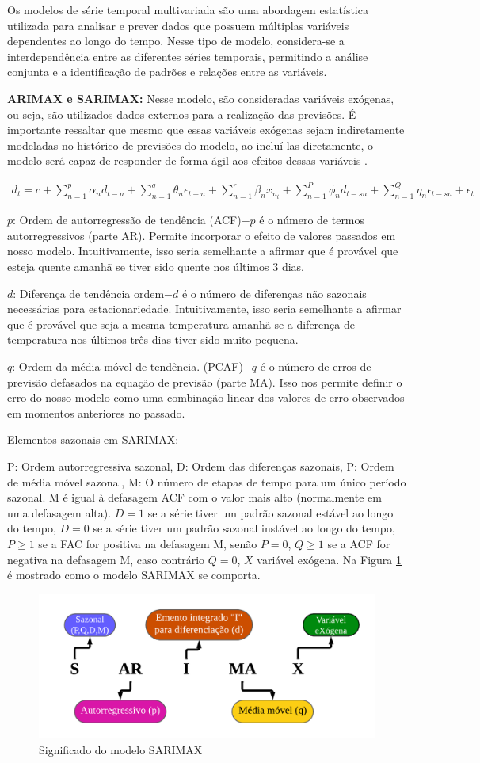Os modelos de série temporal multivariada são uma abordagem estatística utilizada para analisar e prever dados que possuem múltiplas variáveis dependentes ao longo do tempo. Nesse tipo de modelo, considera-se a interdependência entre as diferentes séries temporais, permitindo a análise conjunta e a identificação de padrões e relações entre as variáveis. 

\textbf{ARIMAX e SARIMAX:}
Nesse modelo, são consideradas variáveis exógenas, ou seja, são utilizados dados externos para a realização das previsões. É importante ressaltar que mesmo que essas variáveis exógenas sejam indiretamente modeladas no histórico de previsões do modelo, ao incluí-las diretamente, o modelo será capaz de responder de forma ágil aos efeitos dessas variáveis  \cite{sarima}.

\begin{eqnarray}
	d_t=c+\sum_{n=1}^p \alpha_n d_{t-n}+\sum_{n=1}^q \theta_n \epsilon_{t-n}+\sum_{n=1}^r \beta_n x_{n_t}+\sum_{n=1}^P \phi_n d_{t-s n}+\sum_{n=1}^Q \eta_n \epsilon_{t-s n}+\epsilon_t \label{eq:sarmax}
\end{eqnarray}

$p$: Ordem de autorregressão de tendência (ACF)$-p$ é o número de termos autorregressivos (parte AR). Permite incorporar o efeito de valores passados em nosso modelo. Intuitivamente, isso seria semelhante a afirmar que é provável que esteja quente amanhã se tiver sido quente nos últimos 3 dias.

$d$: Diferença de tendência ordem$-d$ é o número de diferenças não sazonais necessárias para estacionariedade. Intuitivamente, isso seria semelhante a afirmar que é provável que seja a mesma temperatura amanhã se a diferença de temperatura nos últimos três dias tiver sido muito pequena.

$q$: Ordem da média móvel de tendência. (PCAF)$-q$ é o número de erros de previsão defasados na equação de previsão (parte MA). Isso nos permite definir o erro do nosso modelo como uma combinação linear dos valores de erro observados em momentos anteriores no passado.

Elementos sazonais em SARIMAX:

P: Ordem autorregressiva sazonal,
D: Ordem das diferenças sazonais,
P: Ordem de média móvel sazonal,
M: O número de etapas de tempo para um único período sazonal.
M é igual à defasagem ACF com o valor mais alto (normalmente em uma defasagem alta).
$D=1$ se a série tiver um padrão sazonal estável ao longo do tempo,
$D=0$ se a série tiver um padrão sazonal instável ao longo do tempo,
$P\geq1$ se a FAC for positiva na defasagem M, senão $P=0$,
$Q\geq1$ se a ACF for negativa na defasagem M, caso contrário $Q=0$,
$X$ variável exógena.
Na Figura \ref{fig:sarimaxmap} é mostrado como o modelo SARIMAX se comporta.


\begin{figure}[H]
	\centering
	\caption{Significado do modelo SARIMAX}
	\label{fig:sarimaxmap}
	\includegraphics[width=0.7\linewidth]{Modelos/Figuras/sarimax_map}
	
\end{figure}

